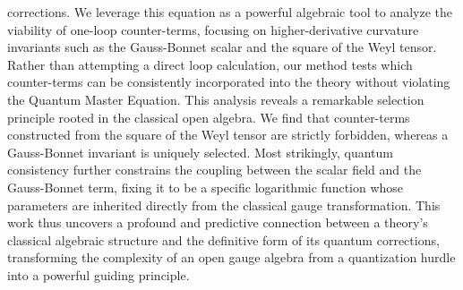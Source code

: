 \documentclass[twocolumn]{aastex631}
\begin{document}
corrections. We leverage this equation as a powerful algebraic tool to analyze the viability of one-loop counter-terms, focusing on higher-derivative curvature invariants such as the Gauss-Bonnet scalar and the square of the Weyl tensor. Rather than attempting a direct loop calculation, our method tests which counter-terms can be consistently incorporated into the theory without violating the Quantum Master Equation. This analysis reveals a remarkable selection principle rooted in the classical open algebra. We find that counter-terms constructed from the square of the Weyl tensor are strictly forbidden, whereas a Gauss-Bonnet invariant is uniquely selected. Most strikingly, quantum consistency further constrains the coupling between the scalar field and the Gauss-Bonnet term, fixing it to be a specific logarithmic function whose parameters are inherited directly from the classical gauge transformation. This work thus uncovers a profound and predictive connection between a theory's classical algebraic structure and the definitive form of its quantum corrections, transforming the complexity of an open gauge algebra from a quantization hurdle into a powerful guiding principle.
\end{document}
